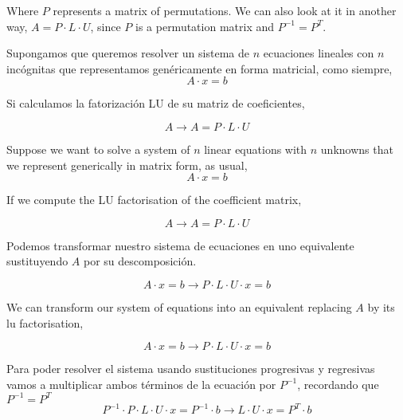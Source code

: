 \begin{paracol}{2}
Where $P$ represents a matrix of permutations.
We can also look at it in another way, $A=P \cdot L \cdot U$, since $P$ is a permutation matrix and $P^{-1}=P^T$.

\switchcolumn
Supongamos que queremos resolver un sistema de $n$ ecuaciones lineales con $n$ incógnitas que representamos genéricamente en forma matricial, como siempre,
\begin{equation*}
A\cdot x=b
\end{equation*}

Si calculamos la fatorización LU de su matriz de  coeficientes,

\begin{equation*}
A \rightarrow A =  P\cdot  L\cdot U
\end{equation*}

\switchcolumn
Suppose we want to solve a system of $n$ linear equations with $n$ unknowns that we represent generically in matrix form, as usual,
\begin{equation*}
A\cdot x=b
\end{equation*}

If we compute the LU factorisation of the coefficient matrix,

\begin{equation*}
A \rightarrow  A = P\cdot L\cdot U
\end{equation*}

\switchcolumn

Podemos transformar nuestro sistema de ecuaciones en uno equivalente sustituyendo $A$ por su descomposición.

\begin{equation*}
A\cdot x=b\rightarrow P\cdot L \cdot U \cdot x= b
\end{equation*}

\switchcolumn
We can transform our system of equations into an equivalent replacing $A$ by its lu factorisation,

\begin{equation*}
A\cdot x=b\rightarrow P\cdot L \cdot U \cdot x= b
\end{equation*}

\switchcolumn
Para poder resolver el sistema usando sustituciones progresivas y regresivas vamos a multiplicar ambos términos de la ecuación por $P^{-1}$, recordando que $P^{-1}=P^T$
\begin{equation*}
P^{-1} \cdot P\cdot L \cdot U \cdot x=P^{-1}\cdot b \rightarrow L\cdot U \cdot x= P^T\cdot b
\end{equation*}


\end{paracol}
